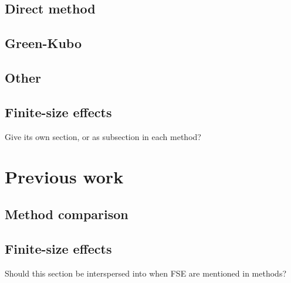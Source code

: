 \subsection{Direct method}

\subsection{Green-Kubo}

\subsection{Other}

\subsection{Finite-size effects}
Give its own section, or as subsection in each method?



\section{Previous work}

\subsection{Method comparison}

\subsection{Finite-size effects}
Should this section be interspersed into when FSE are mentioned in methods?


